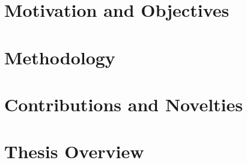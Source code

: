 \section{Motivation and Objectives}


\section{Methodology}


\section{Contributions and Novelties}


\section{Thesis Overview}

